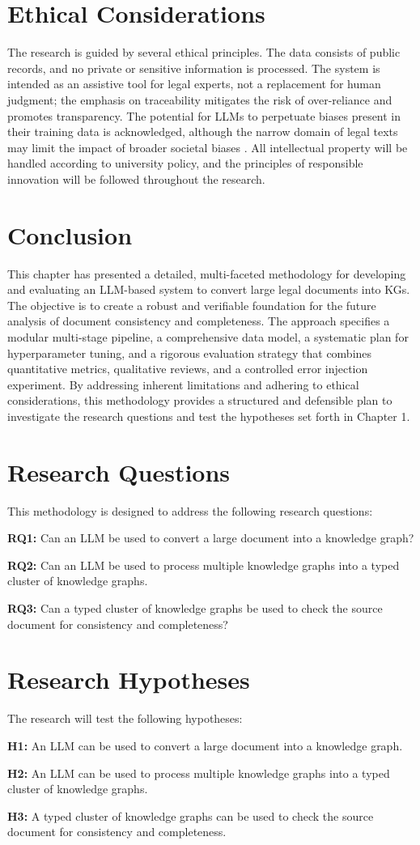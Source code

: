 \section{Ethical Considerations}
The research is guided by several ethical principles. The data consists of public records, and no private or sensitive information is processed. The system is intended as an assistive tool for legal experts, not a replacement for human judgment; the emphasis on traceability mitigates the risk of over-reliance and promotes transparency. The potential for LLMs to perpetuate biases present in their training data is acknowledged, although the narrow domain of legal texts may limit the impact of broader societal biases \parencite{RefWorks:RefID:101-zhao2023survey}. All intellectual property will be handled according to university policy, and the principles of responsible innovation will be followed throughout the research.

\section{Conclusion}
This chapter has presented a detailed, multi-faceted methodology for developing and evaluating an LLM-based system to convert large legal documents into KGs. The objective is to create a robust and verifiable foundation for the future analysis of document consistency and completeness. The approach specifies a modular multi-stage pipeline, a comprehensive data model, a systematic plan for hyperparameter tuning, and a rigorous evaluation strategy that combines quantitative metrics, qualitative reviews, and a controlled error injection experiment. By addressing inherent limitations and adhering to ethical considerations, this methodology provides a structured and defensible plan to investigate the research questions and test the hypotheses set forth in Chapter 1.

\section{Research Questions}
This methodology is designed to address the following research questions:

\textbf{RQ1:} Can an LLM be used to convert a large document into a knowledge graph?

\textbf{RQ2:} Can an LLM be used to process multiple knowledge graphs into a typed cluster of knowledge graphs.

\textbf{RQ3:} Can a typed cluster of knowledge graphs be used to check the source document for consistency and completeness?

\section{Research Hypotheses}
The research will test the following hypotheses:

\textbf{H1:} An LLM can be used to convert a large document into a knowledge graph.

\textbf{H2:} An LLM can be used to process multiple knowledge graphs into a typed cluster of knowledge graphs.

\textbf{H3:} A typed cluster of knowledge graphs can be used to check the source document for consistency and completeness.

